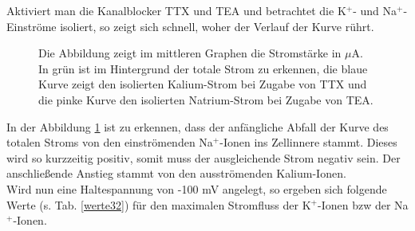 \documentclass[11pt]{article}
\begin{document}
Aktiviert man die Kanalblocker TTX und TEA und betrachtet die K$^+$- und Na$^+$-Einströme isoliert, so zeigt sich schnell, woher der Verlauf der Kurve rührt.  
\begin{figure}[H]
\caption{Die Abbildung zeigt im mittleren Graphen die Stromstärke in $\mu$A. In grün ist im Hintergrund der totale Strom zu erkennen, die blaue Kurve zeigt den isolierten Kalium-Strom bei Zugabe von TTX und die pinke Kurve den isolierten Natrium-Strom bei Zugabe von TEA.}
\label{graph_all}
\end{figure}

In der Abbildung \ref{graph_all} ist zu erkennen, dass der anfängliche Abfall der Kurve des totalen Stroms von den einströmenden Na$^+$-Ionen ins Zellinnere stammt. Dieses wird so kurzzeitig positiv, somit muss der ausgleichende Strom negativ sein. Der anschließende Anstieg stammt von den ausströmenden Kalium-Ionen.\\

Wird nun eine Haltespannung von -100 mV angelegt, so ergeben sich folgende Werte (s. Tab. \ref{werte32}) für den maximalen Stromfluss der K$^+$-Ionen 
bzw der Na$^+$-Ionen.
\end{document}

